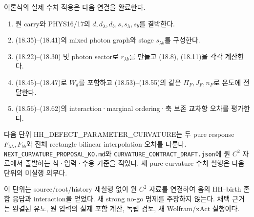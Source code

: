 이론식의 실제 수치 적용은 다음 연결을 완료한다.

\begin{enumerate}
\def\labelenumi{\arabic{enumi}.}
\tightlist
\item
  원 carry와 PHYS16/17의 \(d,d_\lambda,d_b,s,s_\lambda,s_b\)를 결박한다.
\item
  (18.35)--(18.41)의 mixed photon graph와 stage \(s_{\lambda b}\)를
  구성한다.
\item
  (18.22)--(18.30) 및 photon sector로 \(r_{\lambda b}\)를 만들고 (18.8),
  (18.11)을 각각 계산한다.
\item
  (18.45)--(18.47)로 \(W_d\)를 포함하고 (18.53)--(18.55)의 같은
  \(\Pi_F,J_F,n_F\)로 온도에 전달한다.
\item
  (18.56)--(18.62)의 interaction·marginal ordering·축 보존 교차항 오차를
  평가한다.
\end{enumerate}

다음 단위 HH\_DEFECT\_PARAMETER\_CURVATURE는 두 pure response
\(F_{\lambda\lambda},F_{bb}\)와 전체 rectangle bilinear interpolation
오차를 다룬다. \nolinkurl{NEXT_CURVATURE_PROPOSAL_KO.md}와
\nolinkurl{CURVATURE_CONTRACT_DRAFT.json}에 원 \(C^2\) 자료에서 출발하는
식·입력·수용 기준을 적었다. 새 pure-curvature 수치 실행은 다음 단위의
미실행 의무다.

이 단위는 source/root/history 재실행 없이 원 \(C^2\) 자료를 연결하여
음의 HH--birth 혼합 응답과 interaction을 얻었다. 새 strong no-go 명제를
주장하지 않는다. 채택 근거는 완결된 유도, 원 입력의 실제 포함 계산, 독립
검토, 새 Wolfram/xAct 실행이다.
